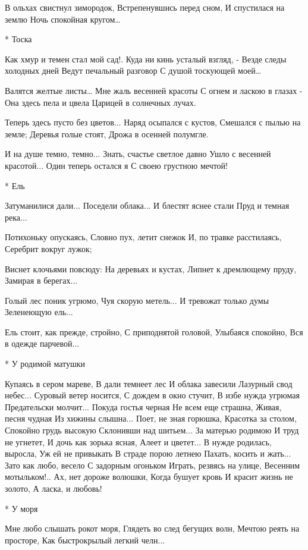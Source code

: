 В ольхах свистнул зимородок,
Встрепенувшись перед сном,
И спустилася на землю
Ночь спокойная кругом…


* Тоска

Как хмур и темен стал мой сад!.
Куда ни кинь усталый взгляд, -
Везде следы холодных дней
Ведут печальный разговор
С душой тоскующей моей…

Валятся желтые листы…
Мне жаль весенней красоты
С огнем и ласкою в глазах -
Она здесь пела и цвела
Царицей в солнечных лучах.

Теперь здесь пусто без цветов...
Наряд осыпался с кустов,
Смешался с пылью на земле;
Деревья голые стоят,
Дрожа в осенней полумгле.

И на душе темно, темно...
Знать, счастье светлое давно
Ушло с весенней красотой...
Один теперь остался я
С своею грустною мечтой!


* Ель

Затуманилися дали...
Поседели облака...
И блестят яснее стали
Пруд и темная река...

Потихоньку опускаясь,
Словно пух, летит снежок
И, по травке расстилаясь,
Серебрит вокруг лужок;

Виснет клочьями повсюду:
На деревьях и кустах,
Липнет к дремлющему пруду,
Замирая в берегах...

Голый лес поник угрюмо,
Чуя скорую метель...
И тревожат только думы
Зеленеющую ель...

Ель стоит, как прежде, стройно,
С приподнятой головой,
Улыбаяся спокойно,
Вся в одежде парчевой...


* У родимой матушки

Купаясь в сером мареве,
В дали темнеет лес
И облака завесили
Лазурный свод небес...
Суровый ветер носится,
С дождем в окно стучит,
В избе нужда угрюмая
Предательски молчит...
Покуда гостья черная
Не всем еще страшна,
Живая, песня чудная
Из хижины слышна...
Поет, не зная горюшка,
Красотка за столом,
Спокойно грудь высокую
Склонивши над шитьем...
За матерью родимою
И труд не угнетет,
И дочь как зорька ясная,
Алеет и цветет...
В нужде родилась, выросла,
Уж ей не привыкать
В страде порою летнею
Пахать, косить и жать...
Зато как любо, весело
С задорным огоньком
Играть, резвясь на улице,
Весенним мотыльком!..
Ах, нет дороже волюшки,
Когда бушует кровь
И красит жизнь не золото,
А ласка, и любовь!


* У моря

Мне любо слышать рокот моря,
Глядеть во след бегущих волн,
Мечтою реять на просторе,
Как быстрокрылый легкий челн...

